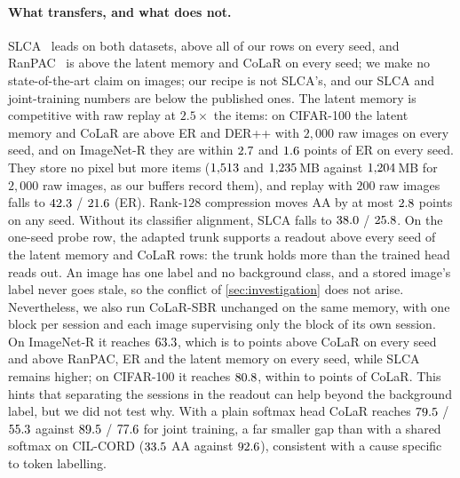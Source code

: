 \paragraph{What transfers, and what does not.} SLCA~\citep{zhang2023slca} leads on both datasets, above all of our rows on every seed, and RanPAC~\citep{mcdonnell2023ranpac} is above the latent memory and CoLaR on every seed; we make no state-of-the-art claim on images; our recipe is not SLCA's, and our SLCA and joint-training numbers are below the published ones. The latent memory is competitive with raw replay at $2.5\times$ the items: on CIFAR-100 the latent memory and CoLaR are above ER and DER++ with $2{,}000$ raw images on every seed, and on ImageNet-R they are within $2.7$ and $1.6$ points of ER on every seed. They store no pixel but more items ($1{,}513$ and $1{,}235$\,MB against $1{,}204$\,MB for $2{,}000$ raw images, as our buffers record them), and replay with $200$ raw images falls to $42.3$ / $21.6$ (ER). Rank-$128$ compression moves AA by at most $2.8$ points on any seed. Without its classifier alignment, SLCA falls to $38.0$ / $25.8$. On the one-seed probe row, the adapted trunk supports a readout above every seed of the latent memory and CoLaR rows: the trunk holds more than the trained head reads out. An image has one label and no background class, and a stored image's label never goes stale, so the conflict of \cref{sec:investigation} does not arise. Nevertheless, we also run CoLaR-SBR unchanged on the same memory, with one block per session and each image supervising only the block of its own session. On ImageNet-R it reaches $63.3$, which is \imgSbrMinusColarImnrMin{} to \imgSbrMinusColarImnrMax{} points above CoLaR on every seed and above RanPAC, ER and the latent memory on every seed, while SLCA remains higher; on CIFAR-100 it reaches $80.8$, within \imgSbrMinusColarCifarMin{} to \imgSbrMinusColarCifarMax{} points of CoLaR. This hints that separating the sessions in the readout can help beyond the background label, but we did not test why. With a plain softmax head CoLaR reaches $79.5$ / $55.3$ against $89.5$ / $77.6$ for joint training, a far smaller gap than with a shared softmax on CIL-CORD ($33.5$ AA against $92.6$), consistent with a cause specific to token labelling.
